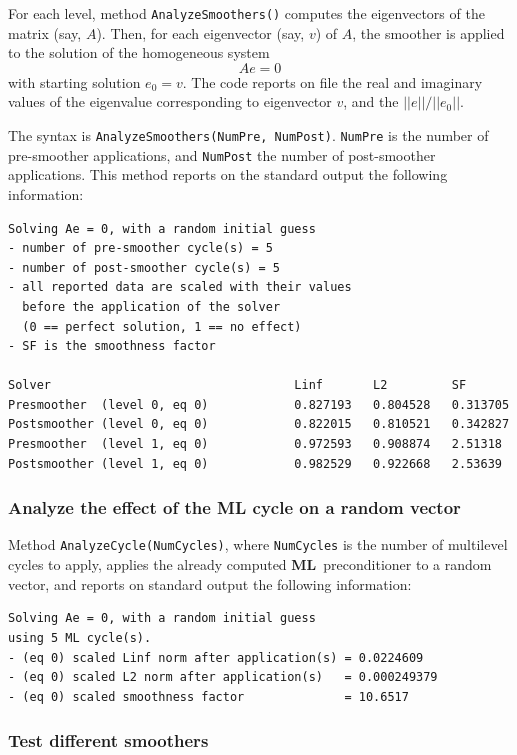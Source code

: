 \documentclass{article}[11pt]
\newcommand{\ML}     {{\bf ML}}
\begin{document}
For each level, method \verb!AnalyzeSmoothers()! computes the eigenvectors of the matrix (say, $A$). 
Then, for each eigenvector (say, $v$) of $A$, the smoother is applied to the solution of the homogeneous system
\[
A e = 0
\]
with starting solution $e_0 = v$. The code reports on file the real and
imaginary values of the eigenvalue corresponding to eigenvector $v$, and the
$||e|| / ||e_0||$. 

The syntax is \verb!AnalyzeSmoothers(NumPre, NumPost)!. \verb!NumPre! is the number of pre-smoother applications, and
\verb!NumPost! the number of post-smoother applications.  
This method reports on the standard output the following information:
\begin{verbatim}
Solving Ae = 0, with a random initial guess
- number of pre-smoother cycle(s) = 5
- number of post-smoother cycle(s) = 5
- all reported data are scaled with their values
  before the application of the solver
  (0 == perfect solution, 1 == no effect)
- SF is the smoothness factor

Solver                                  Linf       L2         SF
Presmoother  (level 0, eq 0)            0.827193   0.804528   0.313705
Postsmoother (level 0, eq 0)            0.822015   0.810521   0.342827
Presmoother  (level 1, eq 0)            0.972593   0.908874   2.51318
Postsmoother (level 1, eq 0)            0.982529   0.922668   2.53639
\end{verbatim}


\subsubsection{Analyze the effect of the ML cycle on a random vector} 

Method \verb!AnalyzeCycle(NumCycles)!, where \verb!NumCycles! is the number of
multilevel cycles to apply, applies the already computed \ML~preconditioner to
a random vector, and reports on standard output the following information:
\begin{verbatim}
Solving Ae = 0, with a random initial guess
using 5 ML cycle(s).
- (eq 0) scaled Linf norm after application(s) = 0.0224609
- (eq 0) scaled L2 norm after application(s)   = 0.000249379
- (eq 0) scaled smoothness factor              = 10.6517
\end{verbatim}



\subsubsection{Test different smoothers} 
\end{document}
